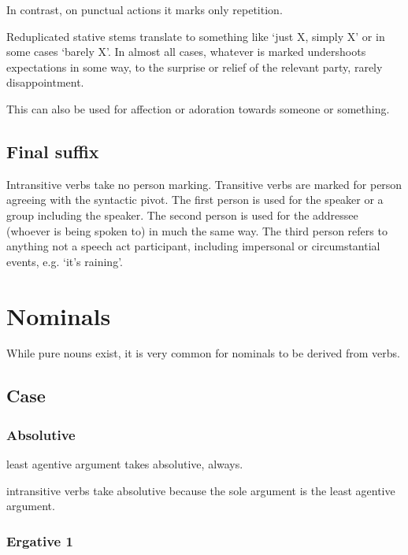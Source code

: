 \documentclass[executivepaper,10pt,twoside,openany,draft]{memoir}
\begin{document}
In contrast, on punctual actions it marks only repetition. 


Reduplicated stative stems translate to something like `just X, simply X' or in some cases `barely X'. In almost all cases, whatever is marked undershoots expectations in some way, to the surprise or relief of the relevant party, rarely disappointment.


This can also be used for affection or adoration towards someone or something.


\section{Final suffix}



Intransitive verbs take no person marking. Transitive verbs are marked for person agreeing with the syntactic pivot. The first person is used for the speaker or a group including the speaker. The second person is used for the addressee (whoever is being spoken to) in much the same way. The third person refers to anything not a speech act participant, including impersonal or circumstantial events, e.g. `it's raining'.

\chapter{Nominals}

While pure nouns exist, it is very common for nominals to be derived from verbs.

\section{Case}

\subsection{Absolutive}

least agentive argument takes absolutive, always. 

intransitive verbs take absolutive because the sole argument is the least agentive argument.

\subsection{Ergative 1}
\end{document}
